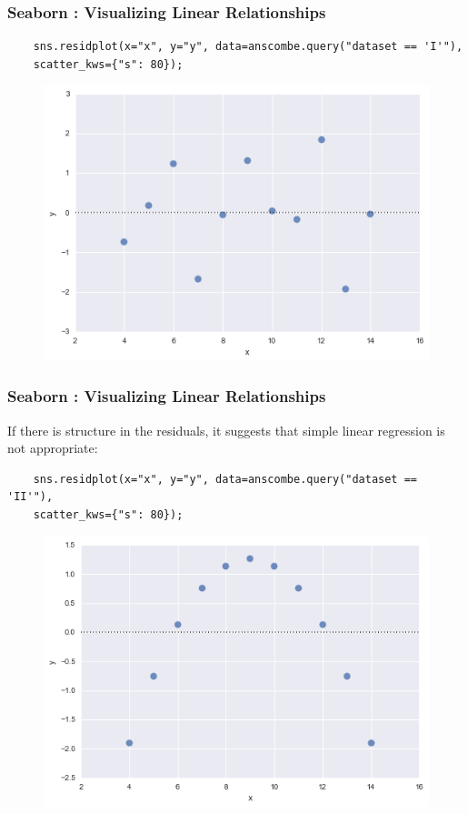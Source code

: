 \documentclass{beamer}
\begin{document}
\begin{frame}[fragile]
	\frametitle{Seaborn : Visualizing Linear Relationships}
	\large
	\begin{verbatim}
	sns.residplot(x="x", y="y", data=anscombe.query("dataset == 'I'"),
	scatter_kws={"s": 80});
	\end{verbatim}
	
	\begin{figure}
		\centering
		\includegraphics[width=0.7\linewidth]{images/regression_35_0}
	\end{figure}
\end{frame}
\begin{frame}[fragile]
	\frametitle{Seaborn : Visualizing Linear Relationships}
	\large
	If there is structure in the residuals, it suggests that simple linear regression is not appropriate:
	\begin{verbatim}
	sns.residplot(x="x", y="y", data=anscombe.query("dataset == 'II'"),
	scatter_kws={"s": 80});
	\end{verbatim}
	\begin{figure}
		\centering
		\includegraphics[width=0.7\linewidth]{images/regression_37_0}
	\end{figure}
	
\end{frame}
\end{document}
